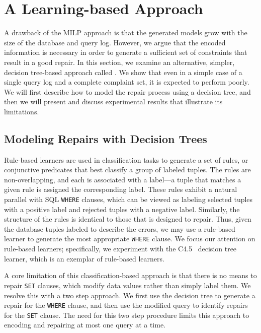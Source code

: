 
\appendix

\section{A Learning-based Approach}
\label{sec:heuristic}
  
A drawback of the MILP approach is that the generated models grow with the 
size of the database and query log.
However, we argue that the encoded information is necessary in order to generate a sufficient set of constraints that result in a good repair.
In this section, we examine an alternative, simpler, decision tree-based approach called \dt. 
We show that even in a simple case of a single query log and a complete complaint set, it is expected to perform poorly.
We will first describe how to model the repair process using a decision tree,
and then we will present and discuss experimental results that illustrate its limitations.

\subsection{Modeling Repairs with Decision Trees}

Rule-based learners are used in classification tasks to generate a set of rules, or conjunctive predicates that best classify a group of labeled tuples.
The rules are non-overlapping, and each is associated with a label---a tuple that matches a given rule is assigned the corresponding label.
These rules exhibit a natural parallel with SQL \texttt{WHERE} clauses, 
which can be viewed as labeling selected tuples with a positive label and rejected tuples with a negative label.
Similarly, the structure of the rules is identical to those that \sys is designed to repair.
Thus, given the database tuples labeled to describe the errors, we may use a rule-based learner to
generate the most appropriate \texttt{WHERE} clause.
We focus our attention on rule-based learners;
specifically, we experiment with the C4.5~\cite{quinlan1987} decision tree learner, which is an 
exemplar of rule-based learners.

A core limitation of this classification-based approach is that there is no means to 
repair \texttt{SET} clauses, which modify data values rather than simply label them.
We resolve this with a two step approach.
We first use the decision tree to generate a repair for the
\texttt{WHERE} clause, and then use the modified query to identify repairs for the \texttt{SET} clause.
The need for this two step procedure limits this approach to encoding and repairing at most one query
at a time.

